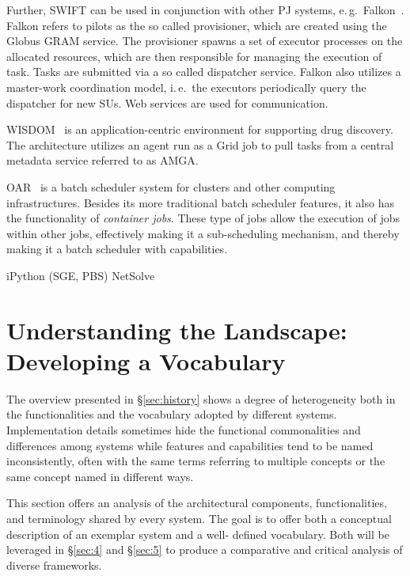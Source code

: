 \documentclass{sig-alternate}
\begin{document}
Further, SWIFT can be used in conjunction with other PJ systems,
e.\,g.\ Falkon~\cite{1362680}. Falkon refers to pilots as the so
called provisioner, which are created using the Globus GRAM
service. The provisioner spawns a set of executor processes on the
allocated resources, which are then responsible for managing the
execution of task. Tasks are submitted via a so called dispatcher
service. Falkon also utilizes a master-work coordination model,
i.\,e.\ the executors periodically query the dispatcher for new
SUs.  Web services are used for communication.

WISDOM~\cite{Ahn:2008:ITR:1444448.1445115,wisdom} is an application-centric
environment for supporting drug discovery. The architecture utilizes an agent
run as a Grid job to pull tasks from a central metadata service referred to as
AMGA.

OAR~\cite{oar} is a batch scheduler system for clusters and other
computing infrastructures. Besides its more traditional batch scheduler
features, it also has the functionality of \textit{container jobs}. These type
of jobs allow the execution of jobs within other jobs, effectively making it a
sub-scheduling mechanism, and thereby making it a batch scheduler with
\pilotjob capabilities. 


iPython (SGE, PBS)
NetSolve~\cite{Casanova:1995:NNS:898848}

\section{Understanding the Landscape: Developing a Vocabulary}
\label{sec:vocab}

The overview presented in \S\ref{sec:history} shows a degree of heterogeneity
both in the functionalities and the vocabulary adopted by different \pilotjob
systems. Implementation details sometimes hide the functional commonalities and
differences among \pilotjobs systems while features and capabilities tend to be
named inconsistently, often with the same terms referring to multiple concepts
or the same concept named in different ways.

This section offers an analysis of the architectural components,
functionalities, and terminology shared by every \pilotjob system.  The goal is
to offer both a conceptual description of an exemplar \pilotjob system and a
well- defined vocabulary. Both will be leveraged in \S\ref{sec:4} and
\S\ref{sec:5} to produce a comparative and critical analysis of diverse
\pilotjob frameworks.
\end{document}
